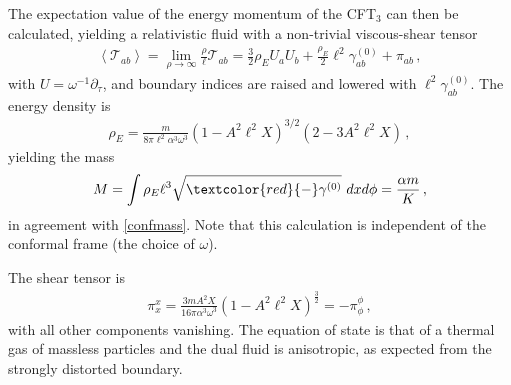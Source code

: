 \documentclass[
twoside,
openright,
frontopenright
]{dmathesis}
\newcommand{\tcr}{\textcolor{red}}
\begin{document}
The expectation value of the energy momentum of the CFT$_{3}$
can then be calculated,
yielding a relativistic fluid with a non-trivial viscous-shear tensor
\begin{align}
\left\langle \mathcal{T}_{ab}\right\rangle =\lim_{\rho \longrightarrow
\infty }\frac{\rho }{\ell}\mathcal{T}_{ab}= \frac32 \rho _{E}
U_{a}U_{b}+\frac{\rho_E}2 \ell^{2} \gamma^{(0)} _{ab}+\pi _{ab}\,,
\end{align}
with $U=\omega^{-1}\partial_\tau$, and boundary indices are
raised and lowered with $\ell^{2}\gamma^{(0)}_{ab}$.
The energy density is
\begin{align}
\rho _{E}= \frac{m}{8\pi\ell^2 \alpha^3\omega^3}(1-A^2\ell^2 X)^{3/2}
(2-3A^{2}\ell^{2}X)\,,
\end{align}
yielding the mass
\begin{align}
M= \int \rho _{E} \ell^3 \sqrt{\tcr{-}\gamma^{(0)}}~dxd\phi
=\frac{\alpha m}{K}\,,
\end{align}
in agreement with \eqref{confmass}. Note that this calculation is independent
of the conformal frame (the choice of $\omega$).

The shear tensor is
\begin{align}
\pi^x_x= \frac{3mA^{2}X}{16\pi \alpha^3\omega^{3}}\left(
1-A^{2}\ell^{2}X\right) ^{\frac32}=-\pi^\phi_\phi\,,
\end{align}
with all other components  vanishing.
The equation of state is that of a thermal gas of massless particles
and the dual fluid is anisotropic,
as expected from the strongly distorted boundary.
\end{document}
